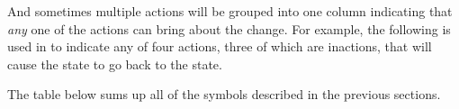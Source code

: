 
And sometimes multiple actions will be grouped into one column indicating
that \textit{any} one of the actions can bring about the change.  For example,
the following is used in  to indicate any of four actions, three of
which are inactions, that will cause the  state to go back to the
 state.


\pagebreak

The table below sums up all of the symbols described in the previous sections.

